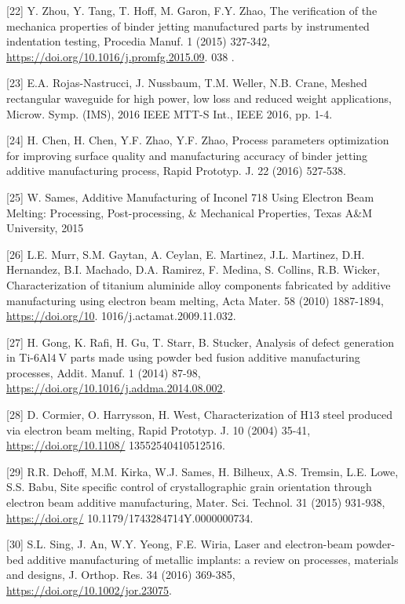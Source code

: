 \documentclass[10pt]{article}
\begin{document}
[22] Y. Zhou, Y. Tang, T. Hoff, M. Garon, F.Y. Zhao, The verification of the mechanica properties of binder jetting manufactured parts by instrumented indentation testing, Procedia Manuf. 1 (2015) 327-342, \href{https://doi.org/10.1016/j.promfg.2015.09}{https://doi.org/10.1016/j.promfg.2015.09}. 038 .

[23] E.A. Rojas-Nastrucci, J. Nussbaum, T.M. Weller, N.B. Crane, Meshed rectangular waveguide for high power, low loss and reduced weight applications, Microw. Symp. (IMS), 2016 IEEE MTT-S Int., IEEE 2016, pp. 1-4.

[24] H. Chen, H. Chen, Y.F. Zhao, Y.F. Zhao, Process parameters optimization for improving surface quality and manufacturing accuracy of binder jetting additive manufacturing process, Rapid Prototyp. J. 22 (2016) 527-538.

[25] W. Sames, Additive Manufacturing of Inconel 718 Using Electron Beam Melting: Processing, Post-processing, \& Mechanical Properties, Texas A\&M University, 2015

[26] L.E. Murr, S.M. Gaytan, A. Ceylan, E. Martinez, J.L. Martinez, D.H. Hernandez, B.I. Machado, D.A. Ramirez, F. Medina, S. Collins, R.B. Wicker, Characterization of titanium aluminide alloy components fabricated by additive manufacturing using electron beam melting, Acta Mater. 58 (2010) 1887-1894, \href{https://doi.org/10}{https://doi.org/10}. 1016/j.actamat.2009.11.032.

[27] H. Gong, K. Rafi, H. Gu, T. Starr, B. Stucker, Analysis of defect generation in Ti-6Al$4 \mathrm{~V}$ parts made using powder bed fusion additive manufacturing processes, Addit. Manuf. 1 (2014) 87-98, \href{https://doi.org/10.1016/j.addma.2014.08.002}{https://doi.org/10.1016/j.addma.2014.08.002}.

[28] D. Cormier, O. Harrysson, H. West, Characterization of $\mathrm{H} 13$ steel produced via electron beam melting, Rapid Prototyp. J. 10 (2004) 35-41, \href{https://doi.org/10.1108/}{https://doi.org/10.1108/} 13552540410512516.

[29] R.R. Dehoff, M.M. Kirka, W.J. Sames, H. Bilheux, A.S. Tremsin, L.E. Lowe, S.S. Babu, Site specific control of crystallographic grain orientation through electron beam additive manufacturing, Mater. Sci. Technol. 31 (2015) 931-938, \href{https://doi.org/}{https://doi.org/} 10.1179/1743284714Y.0000000734.

[30] S.L. Sing, J. An, W.Y. Yeong, F.E. Wiria, Laser and electron-beam powder-bed additive manufacturing of metallic implants: a review on processes, materials and designs, J. Orthop. Res. 34 (2016) 369-385, \href{https://doi.org/10.1002/jor.23075}{https://doi.org/10.1002/jor.23075}.
\end{document}

